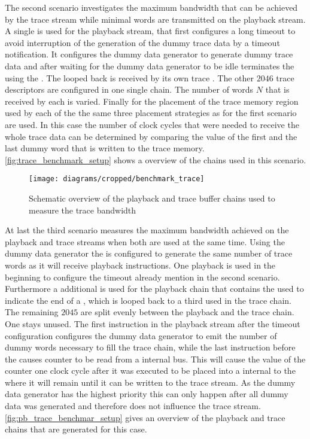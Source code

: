 The second scenario investigates the maximum bandwidth that can be achieved by the trace stream while minimal words are transmitted on the playback stream. A single \descriptor{} is used for the playback stream, that first configures a long timeout to avoid interruption of the generation of the dummy trace data by a timeout notification. It configures the dummy data generator to generate dummy trace data and after waiting for the dummy data generator to be idle terminates the \PlaybackProgram{} using the \haltInstr{}. The looped back \haltInstr{} is received by its own trace \descriptor{}. The other $\num{2046}$ trace descriptors are configured in one single \descriptor{} chain. The number of words $N$ that is received by each \descriptor{} is varied. Finally for the placement of the trace memory region used by each of the \descriptor{} the same three placement strategies as for the first scenario are used. In this case the number of clock cycles that were needed to receive the whole trace data can be determined by comparing the \systime{} value of the first and the last dummy word that is written to the trace memory. \autoref{fig:trace_benchmark_setup} shows a overview of the \descriptor{} chains used in this scenario.

\begin{figure}[htbp]
\centerline{\texttt{[image: diagrams/cropped/benchmark\_trace]}}
\caption{Schematic overview of the playback and trace buffer chains used to measure the trace bandwidth}\label{fig:trace_benchmark_setup}
\end{figure}

At last the third scenario measures the maximum bandwidth achieved on the playback and trace streams when both are used at the same time. Using the dummy data generator the \pbexec{} is configured to generate the same number of trace words as it will receive playback instructions. One playback \descriptor{} is used in the beginning to configure the timeout already mention in the second scenario. Furthermore a additional \descriptor{} is used for the playback chain that contains the \haltInstr{} used to indicate the end of a \PlaybackProgram{}, which is looped back to a third \descriptor{} used in the trace chain. The remaining $\num{2045}$ are split evenly between the playback and the trace chain. One \descriptor{} stays unused. The first instruction in the playback stream after the timeout configuration configures the dummy data generator to emit the number of dummy words necessary to fill the trace \descriptor{} chain, while the last instruction before the \haltInstr{} causes \systime{} counter to be read from a \FPGA{} internal bus. This will cause the value of the \systime{} counter one clock cycle after it was executed to be placed into a \FIFO{} internal to the \pbexec{} where it will remain until it can be written to the trace stream. As the dummy data generator has the highest priority this can only happen after all dummy data was generated and therefore does not influence the trace stream. \autoref{fig:pb_trace_benchmar_setup} gives an overview of the playback and trace chains that are generated for this case.

